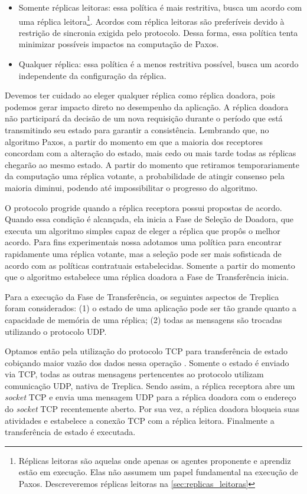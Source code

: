 \begin{itemize}
  \item Somente réplicas leitoras: essa política é mais restritiva, busca um acordo com
    uma réplica leitora\footnote{Réplicas leitoras são aquelas onde apenas os agentes
    proponente e aprendiz estão em execução. Elas não assumem um papel fundamental na
    execução de Paxos. Descreveremos réplicas leitoras na
    \autoref{sec:replicas_leitoras}}.
    Acordos com réplica leitoras são preferíveis devido à restrição de sincronia exigida
    pelo protocolo. Dessa forma, essa política tenta minimizar possíveis impactos na
    computação de Paxos.
  \item Qualquer réplica: essa política é a menos restritiva possível, busca um acordo
    independente da configuração da réplica.
\end{itemize}

Devemos ter cuidado ao eleger qualquer réplica como réplica doadora, pois podemos gerar
impacto direto no desempenho da aplicação. A réplica doadora não participará da decisão de
um nova requisição durante o período que está transmitindo seu estado para garantir a
consistência. Lembrando que, no algoritmo Paxos, a partir do momento em que a maioria dos
receptores concordam com a alteração do estado, mais cedo ou mais tarde todas as réplicas
chegarão ao mesmo estado. A partir do momento que retiramos temporariamente da computação
uma réplica votante, a probabilidade de atingir consenso pela maioria diminui, podendo até
impossibilitar o progresso do algoritmo.

O protocolo progride quando a réplica receptora possui propostas de acordo. Quando essa
condição é alcançada, ela inicia a Fase de Seleção de Doadora, que executa um algoritmo
simples capaz de eleger a réplica que propôs o melhor acordo. Para fins experimentais
nossa adotamos uma política para encontrar rapidamente uma réplica votante, mas a seleção
pode ser mais sofisticada de acordo com as políticas contratuais estabelecidas. Somente a
partir do momento que o algoritmo estabelece uma réplica doadora a Fase de Transferência
inicia.

Para a execução da Fase de Transferência, os seguintes aspectos de Treplica foram
considerados: (1) o estado de uma aplicação pode ser tão grande quanto a capacidade de
memória de uma réplica; (2) todas as mensagens são trocadas utilizando o protocolo UDP.

Optamos então pela utilização do protocolo TCP para transferência de estado cobiçando
maior vazão dos dados nessa operação \cite{abdellatif04}. Somente o estado é enviado via
TCP, todas as outras mensagens pertencentes ao protocolo utilizam comunicação UDP, nativa
de Treplica. Sendo assim, a réplica receptora abre um \emph{socket} TCP e envia uma
mensagem UDP  para a réplica doadora com o endereço do \emph{socket}
TCP recentemente aberto. Por sua vez, a réplica doadora bloqueia suas atividades e
estabelece a conexão TCP com a réplica leitora. Finalmente a transferência de estado é
executada.

